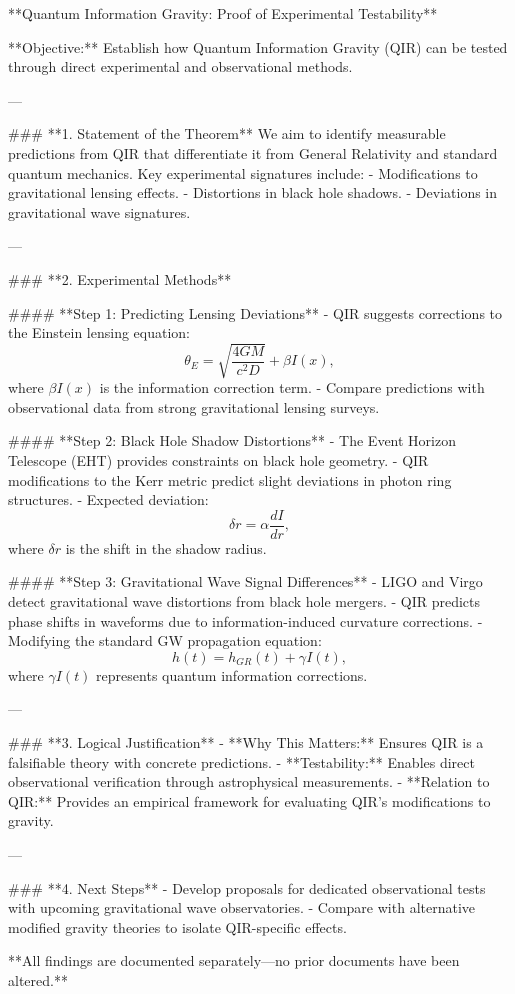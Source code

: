 **Quantum Information Gravity: Proof of Experimental Testability**

**Objective:** Establish how Quantum Information Gravity (QIR) can be tested through direct experimental and observational methods.

---

### **1. Statement of the Theorem**
We aim to identify measurable predictions from QIR that differentiate it from General Relativity and standard quantum mechanics. Key experimental signatures include:
- Modifications to gravitational lensing effects.
- Distortions in black hole shadows.
- Deviations in gravitational wave signatures.

---

### **2. Experimental Methods**

#### **Step 1: Predicting Lensing Deviations**
- QIR suggests corrections to the Einstein lensing equation:
  \begin{equation}
      \theta_E = \sqrt{\frac{4GM}{c^2 D}} + \beta I(x),
  \end{equation}
  where \( \beta I(x) \) is the information correction term.
- Compare predictions with observational data from strong gravitational lensing surveys.

#### **Step 2: Black Hole Shadow Distortions**
- The Event Horizon Telescope (EHT) provides constraints on black hole geometry.
- QIR modifications to the Kerr metric predict slight deviations in photon ring structures.
- Expected deviation:
  \begin{equation}
      \delta r = \alpha \frac{dI}{dr},
  \end{equation}
  where \( \delta r \) is the shift in the shadow radius.

#### **Step 3: Gravitational Wave Signal Differences**
- LIGO and Virgo detect gravitational wave distortions from black hole mergers.
- QIR predicts phase shifts in waveforms due to information-induced curvature corrections.
- Modifying the standard GW propagation equation:
  \begin{equation}
      h(t) = h_{GR}(t) + \gamma I(t),
  \end{equation}
  where \( \gamma I(t) \) represents quantum information corrections.

---

### **3. Logical Justification**
- **Why This Matters:** Ensures QIR is a falsifiable theory with concrete predictions.
- **Testability:** Enables direct observational verification through astrophysical measurements.
- **Relation to QIR:** Provides an empirical framework for evaluating QIR’s modifications to gravity.

---

### **4. Next Steps**
- Develop proposals for dedicated observational tests with upcoming gravitational wave observatories.
- Compare with alternative modified gravity theories to isolate QIR-specific effects.

**All findings are documented separately—no prior documents have been altered.**

